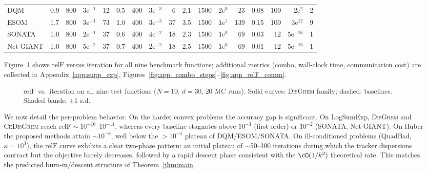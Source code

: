 \documentclass[review,onefignum,onetabnum]{siamart171218}
\begin{document}
\begin{table}[htbp]
{\begin{tabular}{l rrrr rrrr rrrr rrrr}
			DQM    & 0.9 & 800 & $3\mathrm{e}^{-1}$  & 12
			& 0.5 & 400 & $3\mathrm{e}^{-3}$  & 6
			& 2.1 & 1500 & $2\mathrm{e}^{0}$   & 23
			& 0.08 & 100 & $2\mathrm{e}^{2}$   & 2 \\
			ESOM   & 1.7 & 800 & $3\mathrm{e}^{-1}$  & 73
			& 1.0 & 400 & $3\mathrm{e}^{-3}$  & 37
			& 3.5 & 1500 & $1\mathrm{e}^{1}$   & 139
			& 0.15 & 100 & $3\mathrm{e}^{12}$  & 9 \\
			SONATA & 1.0 & 800 & $2\mathrm{e}^{-1}$  & 37
			& 0.6 & 400 & $4\mathrm{e}^{-2}$  & 18
			& 2.3 & 1500 & $1\mathrm{e}^{0}$   & 69
			& 0.03 & 12  & $5\mathrm{e}^{-16}$ & 1 \\
			Net-GIANT & 1.0 & 800 & $5\mathrm{e}^{-2}$ & 37
			& 0.7 & 400 & $2\mathrm{e}^{-2}$  & 18
			& 2.5 & 1500 & $1\mathrm{e}^{0}$   & 69
			& 0.01 & 12  & $5\mathrm{e}^{-16}$ & 1 \\
				\bottomrule
		\end{tabular}}
	\end{table}
	
	Figure~\ref{fig:relF_steps_all} shows $\mathrm{relF}$ versus iteration for
	all nine benchmark functions; additional metrics (combo, wall-clock
	time, communication cost) are collected in
	Appendix~\ref{app:supp_exp},
	Figures~\ref{fig:app_combo_steps}--\ref{fig:app_relF_comm}.
	
	\begin{figure}[htbp]
		\centering
		\caption{$\mathrm{relF}$ vs.\ iteration on all nine test functions
			($N{=}10$, $d{=}30$, 20 MC runs).
			Solid curves: \textsc{DisGrem} family; dashed: baselines.
			Shaded bands: $\pm 1$ s.d.}
		\label{fig:relF_steps_all}
	\end{figure}
	
	We now detail the per-problem behavior.
	On the harder convex problems the accuracy gap is significant.
	On LogSumExp, \textsc{DisGrem} and \textsc{CeDisGrem} reach
	$\mathrm{relF}\sim10^{-10}$--$10^{-11}$, whereas every baseline
	stagnates above $10^{-3}$ (first-order) or $10^{-2}$
	(SONATA, Net-GIANT).
	On Huber the proposed methods attain $\sim10^{-6}$, well
	below the $>10^{-1}$ plateau of DQM/ESOM/SONATA.
	On ill-conditioned problems (QuadBad, $\kappa{=}10^3$), the $\mathrm{relF}$
	curve exhibits a clear two-phase pattern: an initial plateau of
	$\sim$50--100 iterations during which the tracker dispersions
	contract but the objective barely decreases, followed by a rapid
	descent phase consistent with the $\cO(1/k^2)$ theoretical rate.
	This matches the predicted burn-in/descent structure of
	Theorem~\ref{thm:main}.
\end{document}
